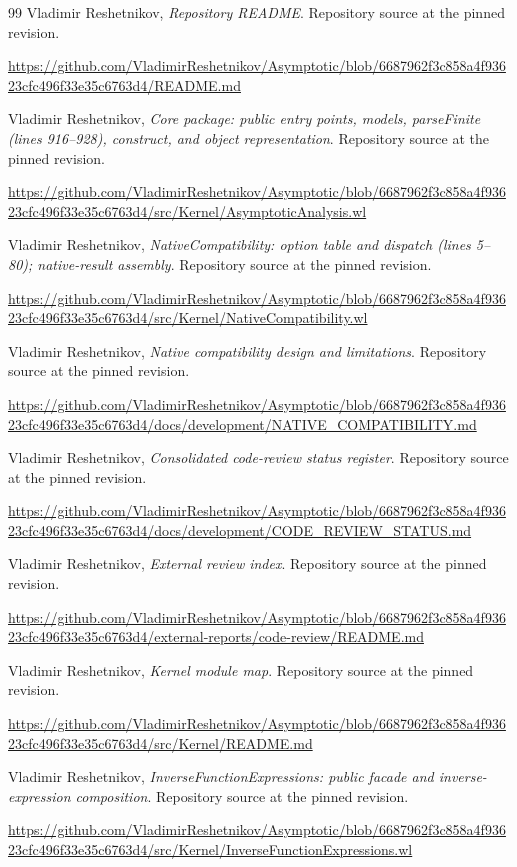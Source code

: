 \documentclass[11pt,a4paper]{article}
\begin{document}
\newpage
\begin{thebibliography}{99}
\small
{} Vladimir Reshetnikov, \emph{Repository README}. Repository source at the pinned revision.\par
\url{https://github.com/VladimirReshetnikov/Asymptotic/blob/6687962f3c858a4f93623cfc496f33e35c6763d4/README.md}

 Vladimir Reshetnikov, \emph{Core package: public entry points, models, parseFinite (lines 916--928), construct, and object representation}. Repository source at the pinned revision.\par
\url{https://github.com/VladimirReshetnikov/Asymptotic/blob/6687962f3c858a4f93623cfc496f33e35c6763d4/src/Kernel/AsymptoticAnalysis.wl}

 Vladimir Reshetnikov, \emph{NativeCompatibility: option table and dispatch (lines 5--80); native-result assembly}. Repository source at the pinned revision.\par
\url{https://github.com/VladimirReshetnikov/Asymptotic/blob/6687962f3c858a4f93623cfc496f33e35c6763d4/src/Kernel/NativeCompatibility.wl}

 Vladimir Reshetnikov, \emph{Native compatibility design and limitations}. Repository source at the pinned revision.\par
\url{https://github.com/VladimirReshetnikov/Asymptotic/blob/6687962f3c858a4f93623cfc496f33e35c6763d4/docs/development/NATIVE_COMPATIBILITY.md}

 Vladimir Reshetnikov, \emph{Consolidated code-review status register}. Repository source at the pinned revision.\par
\url{https://github.com/VladimirReshetnikov/Asymptotic/blob/6687962f3c858a4f93623cfc496f33e35c6763d4/docs/development/CODE_REVIEW_STATUS.md}

 Vladimir Reshetnikov, \emph{External review index}. Repository source at the pinned revision.\par
\url{https://github.com/VladimirReshetnikov/Asymptotic/blob/6687962f3c858a4f93623cfc496f33e35c6763d4/external-reports/code-review/README.md}

 Vladimir Reshetnikov, \emph{Kernel module map}. Repository source at the pinned revision.\par
\url{https://github.com/VladimirReshetnikov/Asymptotic/blob/6687962f3c858a4f93623cfc496f33e35c6763d4/src/Kernel/README.md}

 Vladimir Reshetnikov, \emph{InverseFunctionExpressions: public facade and inverse-expression composition}. Repository source at the pinned revision.\par
\url{https://github.com/VladimirReshetnikov/Asymptotic/blob/6687962f3c858a4f93623cfc496f33e35c6763d4/src/Kernel/InverseFunctionExpressions.wl}


\end{thebibliography}
\end{document}
